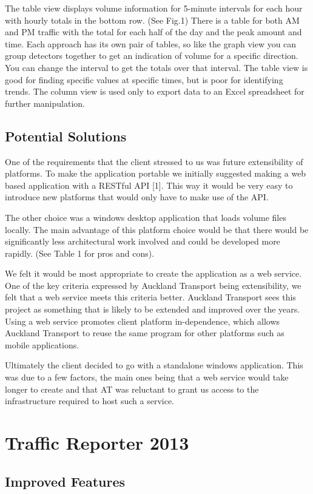 \documentclass{article}
\begin{document}
The table view displays volume information for 5-minute
intervals for each hour with hourly totals in the bottom row.
(See Fig.1) There is a table for both AM and PM traffic with
the total for each half of the day and the peak amount and
time. Each approach has its own pair of tables, so like the
graph view you can group detectors together to get an
indication of volume for a specific direction. You can change
the interval to get the totals over that interval.
The table view is good for finding specific values at
specific times, but is poor for identifying trends.
The column view is used only to export data to an Excel
spreadsheet for further manipulation.

\subsection{Potential Solutions}
One of the requirements that the client stressed to us was
future extensibility of platforms. To make the application
portable we initially suggested making a web based
application with a RESTful API [1]. This way it would be
very easy to introduce new platforms that would only have to
make use of the API.

The other choice was a windows desktop application that
loads volume files locally. The main advantage of this
platform choice would be that there would be significantly less
architectural work involved and could be developed more
rapidly. (See Table 1 for pros and cons).

We felt it would be most appropriate to create the
application as a web service. One of the key criteria expressed
by Auckland Transport being extensibility, we felt that a web
service meets this criteria better. Auckland Transport sees this
project as something that is likely to be extended and
improved over the years. Using a web service promotes client
platform in-dependence, which allows Auckland Transport to
reuse the same program for other platforms such as mobile
applications.

Ultimately the client decided to go with a standalone
windows application. This was due to a few factors, the main
ones being that a web service would take longer to create and
that AT was reluctant to grant us access to the infrastructure
required to host such a service.

\section{Traffic Reporter 2013}
\subsection{Improved Features}
\end{document}
